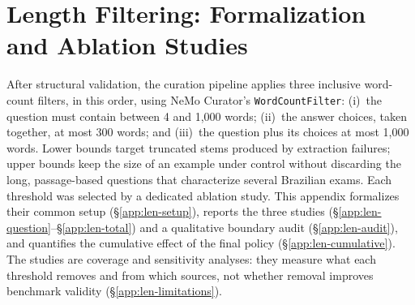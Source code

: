 %
%
\providecommand{\LengthAblationFigDir}{figures}

\section{Length Filtering: Formalization and Ablation Studies}
\label{app:len}

After structural validation, the curation pipeline applies three inclusive
word-count filters, in this order, using NeMo Curator's
\texttt{WordCountFilter}: (i)~the question must contain between 4 and 1,000
words; (ii)~the answer choices, taken together, at most 300 words; and
(iii)~the question plus its choices at most 1,000 words. Lower bounds target
truncated stems produced by extraction failures; upper bounds keep the size of
an example under control without discarding the long, passage-based questions
that characterize several Brazilian exams. Each threshold was selected by a
dedicated ablation study. This appendix formalizes their common setup
(\S\ref{app:len-setup}), reports the three studies
(\S\ref{app:len-question}--\S\ref{app:len-total}) and a qualitative boundary
audit (\S\ref{app:len-audit}), and quantifies the cumulative effect of the
final policy (\S\ref{app:len-cumulative}). The studies are coverage and
sensitivity analyses: they measure what each threshold removes and from which
sources, not whether removal improves benchmark validity
(\S\ref{app:len-limitations}).

